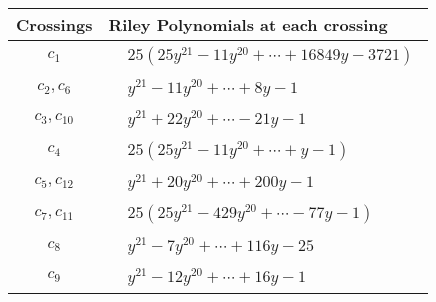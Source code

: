 \documentclass[1p]{elsarticle_modified}
\theoremstyle{definition}
\begin{document}
\begin{tabular}{m{50pt}|m{274pt}}
Crossings & \hspace{64pt}Riley Polynomials at each crossing \\
\hline $$\begin{aligned}c_{1}\end{aligned}$$&$\begin{aligned}
&25(25 y^{21}-11 y^{20}+\cdots+16849 y-3721)
\end{aligned}$\\
\hline $$\begin{aligned}c_{2},c_{6}\end{aligned}$$&$\begin{aligned}
&y^{21}-11 y^{20}+\cdots+8 y-1
\end{aligned}$\\
\hline $$\begin{aligned}c_{3},c_{10}\end{aligned}$$&$\begin{aligned}
&y^{21}+22 y^{20}+\cdots-21 y-1
\end{aligned}$\\
\hline $$\begin{aligned}c_{4}\end{aligned}$$&$\begin{aligned}
&25(25 y^{21}-11 y^{20}+\cdots+y-1)
\end{aligned}$\\
\hline $$\begin{aligned}c_{5},c_{12}\end{aligned}$$&$\begin{aligned}
&y^{21}+20 y^{20}+\cdots+200 y-1
\end{aligned}$\\
\hline $$\begin{aligned}c_{7},c_{11}\end{aligned}$$&$\begin{aligned}
&25(25 y^{21}-429 y^{20}+\cdots-77 y-1)
\end{aligned}$\\
\hline $$\begin{aligned}c_{8}\end{aligned}$$&$\begin{aligned}
&y^{21}-7 y^{20}+\cdots+116 y-25
\end{aligned}$\\
\hline $$\begin{aligned}c_{9}\end{aligned}$$&$\begin{aligned}
&y^{21}-12 y^{20}+\cdots+16 y-1
\end{aligned}$\\
\hline
\end{tabular}\\~\\
\end{document}
